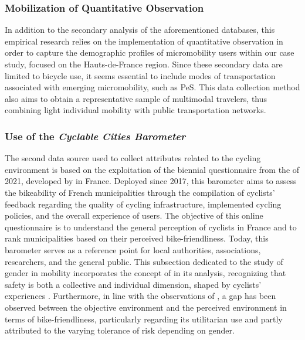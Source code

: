\begin{refsegment}
\subsubsection*{Mobilization of Quantitative Observation
    \label{chap4:variables-age-genre-observation-quantitative}
    }

In addition to the secondary analysis of the aforementioned databases, this empirical research relies on the implementation of quantitative observation in order to capture the demographic profiles of micromobility users within our case study, focused on the Hauts-de-France region. Since these secondary data are limited to bicycle use, it seems essential to include modes of transportation associated with emerging micromobility, such as \acrshort{PeS}. This data collection method also aims to obtain a representative sample of multimodal travelers, thus combining light individual mobility with public transportation networks. %

\subsubsection*{Use of the \textsl{Cyclable Cities Barometer}
    \label{chap4:source-barometre-fub}
    }

The second data source used to collect attributes related to the cycling environment is based on the exploitation of the biennial questionnaire from the  of 2021, developed by \textcolor{blue}{\textcite{fub_barometre_2021}} in France. Deployed since 2017, this barometer aims to assess the bikeability of French municipalities through the compilation of cyclists' feedback regarding the quality of cycling infrastructure, implemented cycling policies, and the overall experience of users. The objective of this online questionnaire is to understand the general \gls{perception} of cyclists in France and to rank municipalities based on their perceived bike-friendliness. Today, this barometer serves as a reference point for local authorities, associations, researchers, and the general public. This subsection dedicated to the study of gender in mobility incorporates the concept of  in its analysis, recognizing that safety is both a collective and individual dimension, shaped by cyclists' experiences \textcolor{blue}{\autocite[57]{garrard_promoting_2008}}. Furthermore, in line with the observations of \textcolor{blue}{\textcite[303]{ma_peoples_2017}}, a gap has been observed between the objective environment and the perceived environment in terms of bike-friendliness, particularly regarding its utilitarian use and partly attributed to the varying tolerance of risk depending on gender. %


\end{refsegment}
